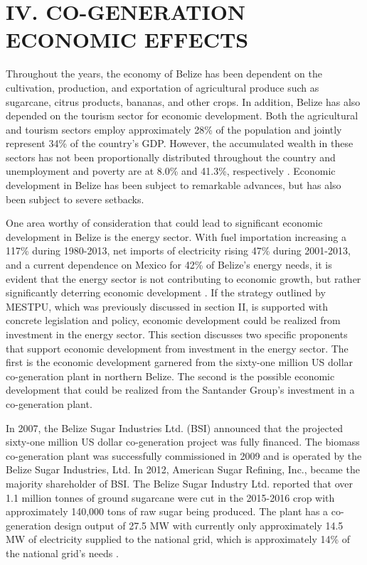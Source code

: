 \documentclass[twocolumn,10pt]{asme2e}
\begin{document}
\section*{IV. CO-GENERATION ECONOMIC EFFECTS}

Throughout the years, the economy of Belize has been dependent on the cultivation, production, and exportation of agricultural produce such as sugarcane, citrus products, bananas, and other crops. In addition, Belize has also depended on the tourism sector for economic development\cite{econ_richardson}. Both the agricultural and tourism sectors employ approximately 28\% of the population and jointly represent 34\% of the country's GDP\cite{worldbank_stats}. However, the accumulated wealth in these sectors has not been proportionally distributed throughout the country and unemployment and poverty are at 8.0\% and 41.3\%, respectively \cite{sib_pop}. Economic development in Belize has been subject to remarkable advances, but has also been subject to severe setbacks.

One area worthy of consideration that could lead to significant economic development in Belize is the energy sector. With fuel importation increasing a 117\% during 1980-2013, net imports of electricity rising 47\% during 2001-2013, and a current dependence on Mexico for 42\% of Belize's energy needs, it is evident that the energy sector is not contributing to economic growth, but rather significantly deterring economic development\cite{imf_issues} \cite{bel_report}. If the strategy outlined by MESTPU, which was previously discussed in section II, is supported with concrete legislation and policy, economic development could be realized from investment in the energy sector. This section discusses two specific proponents that support economic development from investment in the energy sector. The first is the economic development garnered from the sixty-one million US dollar co-generation plant in northern Belize. The second is the possible economic development that could be realized from the Santander Group's investment in a co-generation plant.  

In 2007, the Belize Sugar Industries Ltd. (BSI) announced that the projected sixty-one million US dollar co-generation project was fully financed. The biomass co-generation plant was successfully commissioned in 2009 and is operated by the Belize Sugar Industries, Ltd. In 2012, American Sugar Refining, Inc., became the majority shareholder of BSI. The Belize Sugar Industry Ltd. reported that over 1.1 million tonnes of ground sugarcane were cut in the 2015-2016 crop with approximately 140,000 tons of raw sugar being produced. The plant has a co-generation design output of 27.5 MW with currently only approximately 14.5 MW of electricity supplied to the national grid, which is approximately 14\% of the national grid's needs \cite{asr_report}.
\end{document}
